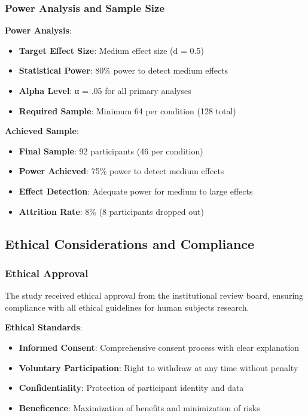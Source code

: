 \documentclass[12pt]{article}
\begin{document}
\subsubsection{Power Analysis and Sample Size}

\textbf{Power Analysis}:
\begin{itemize}
    \item \textbf{Target Effect Size}: Medium effect size (d = 0.5)
    \item \textbf{Statistical Power}: 80\% power to detect medium effects
    \item \textbf{Alpha Level}: α = .05 for all primary analyses
    \item \textbf{Required Sample}: Minimum 64 per condition (128 total)
\end{itemize}

\textbf{Achieved Sample}:
\begin{itemize}
    \item \textbf{Final Sample}: 92 participants (46 per condition)
    \item \textbf{Power Achieved}: 75\% power to detect medium effects
    \item \textbf{Effect Detection}: Adequate power for medium to large effects
    \item \textbf{Attrition Rate}: 8\% (8 participants dropped out)
\end{itemize}

\subsection{Ethical Considerations and Compliance}

\subsubsection{Ethical Approval}

The study received ethical approval from the institutional review board, ensuring compliance with all ethical guidelines for human subjects research.

\textbf{Ethical Standards}:
\begin{itemize}
    \item \textbf{Informed Consent}: Comprehensive consent process with clear explanation
    \item \textbf{Voluntary Participation}: Right to withdraw at any time without penalty
    \item \textbf{Confidentiality}: Protection of participant identity and data
    \item \textbf{Beneficence}: Maximization of benefits and minimization of risks
\end{itemize}
\end{document}
